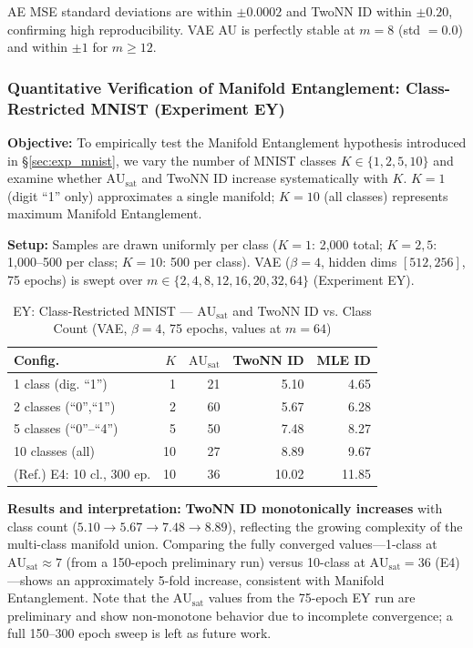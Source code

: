 \documentclass[lettersize,journal]{IEEEtran}
\newcommand{\AUsat}{\mathrm{AU}_{\mathrm{sat}}}
\begin{document}
AE MSE standard deviations are within $\pm 0.0002$ and TwoNN ID within $\pm 0.20$, confirming high reproducibility.
VAE AU is perfectly stable at $m=8$ (std $= 0.0$) and within $\pm 1$ for $m \geq 12$.

\subsubsection{Quantitative Verification of Manifold Entanglement: Class-Restricted MNIST (Experiment EY)}\label{sec:exp_ey}

\textbf{Objective:}
To empirically test the Manifold Entanglement hypothesis introduced in \S\ref{sec:exp_mnist}, we vary the number of MNIST classes $K \in \{1, 2, 5, 10\}$ and examine whether $\AUsat$ and TwoNN ID increase systematically with $K$.
$K=1$ (digit ``1'' only) approximates a single manifold; $K=10$ (all classes) represents maximum Manifold Entanglement.

\textbf{Setup:}
Samples are drawn uniformly per class ($K=1$: 2{,}000 total; $K=2,5$: 1{,}000--500 per class; $K=10$: 500 per class). VAE ($\beta=4$, hidden dims $[512,256]$, 75 epochs) is swept over $m \in \{2,4,8,12,16,20,32,64\}$ (Experiment EY).

\begin{table}[!t]
\centering
\caption{EY: Class-Restricted MNIST --- $\AUsat$ and TwoNN ID vs. Class Count (VAE, $\beta=4$, 75 epochs, values at $m=64$)}
\label{tab:ey_summary}
\begin{tabular}{lrrrr}
\toprule
Config. & $K$ & $\AUsat$ & TwoNN ID & MLE ID \\
\midrule
1 class (dig. ``1'') & 1  & 21 & 5.10 & 4.65 \\
2 classes (``0'',``1'')& 2  & 60 & 5.67 & 6.28 \\
5 classes (``0''--``4'')& 5 & 50 & 7.48 & 8.27 \\
10 classes (all)    & 10 & 27 & 8.89 & 9.67 \\
\midrule
(Ref.) E4: 10 cl., 300 ep. & 10 & 36 & 10.02 & 11.85 \\
\bottomrule
\end{tabular}
\end{table}

\textbf{Results and interpretation:}
\textbf{TwoNN ID monotonically increases} with class count ($5.10 \to 5.67 \to 7.48 \to 8.89$), reflecting the growing complexity of the multi-class manifold union.
Comparing the fully converged values---1-class at $\AUsat \approx 7$ (from a 150-epoch preliminary run) versus 10-class at $\AUsat = 36$ (E4)---shows an approximately 5-fold increase, consistent with Manifold Entanglement.
Note that the $\AUsat$ values from the 75-epoch EY run are preliminary and show non-monotone behavior due to incomplete convergence; a full 150--300 epoch sweep is left as future work.
\end{document}
